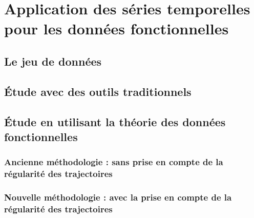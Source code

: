 \chapter{Application des séries temporelles pour les données fonctionnelles}
\minitoc%

\section{Le jeu de données}
\section{Étude avec des outils traditionnels}
\section{Étude en utilisant la théorie des données fonctionnelles}

\subsection{Ancienne méthodologie : sans prise en compte de la régularité des trajectoires}

\subsection{Nouvelle méthodologie : avec la prise en compte de la régularité des trajectoires}